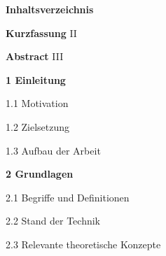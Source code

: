 \documentclass[a4paper,12pt,headsepline]{scrartcl}
\begin{document}







\onehalfspacing

\newpage

\thispagestyle{empty}


\singlespacing

\newpage
\setcounter{page}{1}

\thispagestyle{empty}
\vspace*{1.5cm}
\begin{center}
{\Large \textbf{Inhaltsverzeichnis}}
\end{center}

\vspace{2cm}
\noindent
\textbf{Kurzfassung} \dotfill II

\noindent
\textbf{Abstract} \dotfill III

\vspace{0.5cm}
\noindent
\textbf{1 Einleitung} 

\noindent
\hspace{1cm} 1.1 Motivation 

\noindent
\hspace{1cm} 1.2 Zielsetzung 

\noindent
\hspace{1cm} 1.3 Aufbau der Arbeit 

\vspace{0.5cm}
\noindent
\textbf{2 Grundlagen} 

\noindent
\hspace{1cm} 2.1 Begriffe und Definitionen 

\noindent
\hspace{1cm} 2.2 Stand der Technik 

\noindent
\hspace{1cm} 2.3 Relevante theoretische Konzepte 
\end{document}
